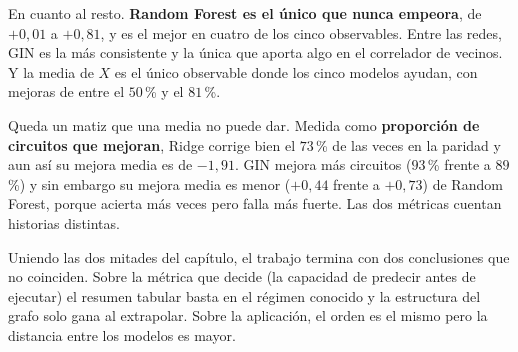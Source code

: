 En cuanto al resto. \textbf{Random Forest es el único que nunca empeora}, de $+0{,}01$ a
$+0{,}81$, y es el mejor en cuatro de los cinco observables. Entre las redes, GIN es la más
consistente y la única que aporta algo en el correlador de vecinos. Y la media de $X$ es el
único observable donde los cinco modelos ayudan, con mejoras de entre el $50$\,\% y el
$81$\,\%.

Queda un matiz que una media no puede dar. Medida como \textbf{proporción de circuitos que
mejoran}, Ridge corrige bien el $73$\,\% de las veces en la paridad y aun así su mejora media
es de $-1{,}91$. GIN mejora más circuitos ($93$\,\% frente a $89$\,\%) y sin
embargo su mejora media es menor ($+0{,}44$ frente a $+0{,}73$) de Random Forest, porque acierta más veces pero
falla más fuerte. Las dos métricas cuentan historias distintas.


Uniendo las dos mitades del capítulo, el trabajo termina con dos conclusiones que no coinciden.
Sobre la métrica que decide (la capacidad de predecir antes de ejecutar) el resumen tabular
basta en el régimen conocido y la estructura del grafo solo gana al extrapolar. Sobre la
aplicación, el orden es el mismo pero la distancia entre los modelos es mayor.


